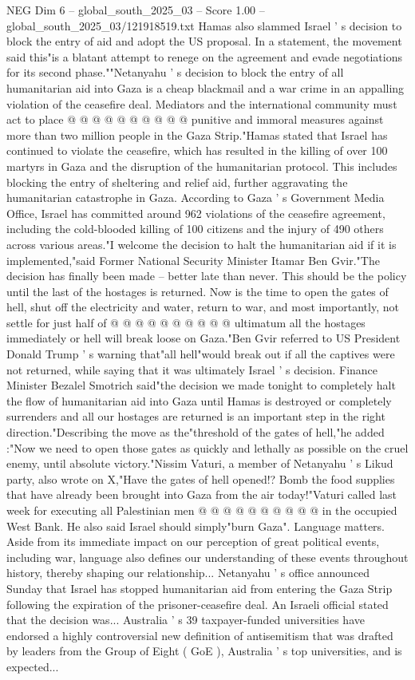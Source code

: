 \begin{textsample}{NEG Dim 6 – global\_south\_2025\_03 – Score 1.00 – global\_south\_2025\_03/121918519.txt}
Hamas also slammed Israel ' s decision to block the entry of aid and adopt the US proposal.
In a statement, the movement said this"is a blatant attempt to renege on the agreement and evade negotiations for its second phase.""Netanyahu ' s decision to block the entry of all humanitarian aid into Gaza is a cheap blackmail and a war crime in an appalling violation of the ceasefire deal.
Mediators and the international community must act to place @ @ @ @ @ @ @ @ @ @ punitive and immoral measures against more than two million people in the Gaza Strip."Hamas stated that Israel has continued to violate the ceasefire, which has resulted in the killing of over 100 martyrs in Gaza and the disruption of the humanitarian protocol.
This includes blocking the entry of sheltering and relief aid, further aggravating the humanitarian catastrophe in Gaza.
According to Gaza ' s Government Media Office, Israel has committed around 962 violations of the ceasefire agreement, including the cold-blooded killing of 100 citizens and the injury of 490 others across various areas."I welcome the decision to halt the humanitarian aid if it is implemented,"said Former National Security Minister Itamar Ben Gvir."The decision has finally been made -- better late than never.
This should be the policy until the last of the hostages is returned.
Now is the time to open the gates of hell, shut off the electricity and water, return to war, and most importantly, not settle for just half of @ @ @ @ @ @ @ @ @ @ ultimatum all the hostages immediately or hell will break loose on Gaza."Ben Gvir referred to US President Donald Trump ' s warning that"all hell"would break out if all the captives were not returned, while saying that it was ultimately Israel ' s decision.
Finance Minister Bezalel Smotrich said"the decision we made tonight to completely halt the flow of humanitarian aid into Gaza until Hamas is destroyed or completely surrenders and all our hostages are returned is an important step in the right direction."Describing the move as the"threshold of the gates of hell,"he added :"Now we need to open those gates as quickly and lethally as possible on the cruel enemy, until absolute victory."Nissim Vaturi, a member of Netanyahu ' s Likud party, also wrote on X,"Have the gates of hell opened!?
Bomb the food supplies that have already been brought into Gaza from the air today!"Vaturi called last week for executing all Palestinian men @ @ @ @ @ @ @ @ @ @ in the occupied West Bank.
He also said Israel should simply"burn Gaza".
Language matters.
Aside from its immediate impact on our perception of great political events, including war, language also defines our understanding of these events throughout history, thereby shaping our relationship...
Netanyahu ' s office announced Sunday that Israel has stopped humanitarian aid from entering the Gaza Strip following the expiration of the prisoner-ceasefire deal.
An Israeli official stated that the decision was...
Australia ' s 39 taxpayer-funded universities have endorsed a highly controversial new definition of antisemitism that was drafted by leaders from the Group of Eight ( GoE ), Australia ' s top universities, and is expected...

\end{textsample}
